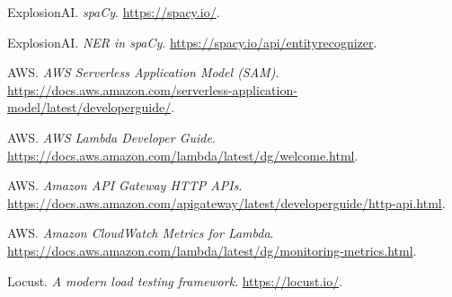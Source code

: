 \documentclass[11pt,a4paper]{article}
\begin{document}
\begin{thebibliography}{9}
ExplosionAI. \emph{spaCy}. \url{https://spacy.io/}.

ExplosionAI. \emph{NER in spaCy}. \url{https://spacy.io/api/entityrecognizer}.

AWS. \emph{AWS Serverless Application Model (SAM)}. \url{https://docs.aws.amazon.com/serverless-application-model/latest/developerguide/}.

AWS. \emph{AWS Lambda Developer Guide}. \url{https://docs.aws.amazon.com/lambda/latest/dg/welcome.html}.

AWS. \emph{Amazon API Gateway HTTP APIs}. \url{https://docs.aws.amazon.com/apigateway/latest/developerguide/http-api.html}.

AWS. \emph{Amazon CloudWatch Metrics for Lambda}. \url{https://docs.aws.amazon.com/lambda/latest/dg/monitoring-metrics.html}.

Locust. \emph{A modern load testing framework}. \url{https://locust.io/}.
\end{thebibliography}
\end{document}
